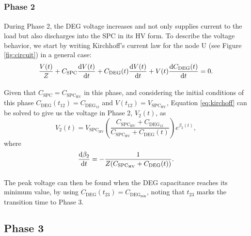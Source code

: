 \subsubsection{Phase 2}

\paragraph{} During Phase 2, the DEG voltage increases and not only supplies current to the load but also discharges into the SPC in its HV form. To describe the voltage behavior, we start by writing Kirchhoff's current law for the node U (see Figure \ref{fig:circuit}) in a general case:
\begin{equation}\label{eq:kirchoff}
\frac{V(t)}{Z} + C_\text{SPC}\frac{\mathrm{d}V(t)}{\mathrm{d}t}+C_\text{DEG}(t)\frac{\mathrm{d}V(t)}{\mathrm{d}t}+V(t)\frac{\mathrm{d}C_\text{DEG}(t)}{\mathrm{d}t} = 0.
\end{equation}

\paragraph{} Given that $C_\text{SPC} =C_{\text{SPC}_\text{HV}}$ in this phase, and considering the initial conditions of this phase $C_\text{DEG}(t_{12}) = C_{\text{DEG}_{12}}$ and $V(t_{12}) = V_{\text{SPC}_\text{HV}}$, Equation \ref{eq:kirchoff} can be solved to give us the voltage in Phase 2, $V_2(t)$, as
\begin{equation}\label{eq:v2t}
V_2(t) = V_{\text{SPC}_\text{HV}}\left(\frac{C_{\text{SPC}_\text{HV}}+C_{\text{DEG}_{12}}}{C_{\text{SPC}_\text{HV}}+C_\text{DEG}(t)}\right)e^{\beta_2(t)},
\end{equation}
where
\begin{equation}
\frac{\mathrm{d}\beta_2}{\mathrm{d}t} = -\frac{1}{Z(C_{\text{SPC}_\text{HV}}+C_\text{DEG}(t))}.
\end{equation}

\paragraph{}The peak voltage can then be found when the DEG capacitance reaches its minimum value, by using $C_\text{DEG}(t_{23}) = C_{\text{DEG}_\text{min}}$, noting that $t_{23}$ marks the transition time to Phase 3.


\subsection{Phase 3}

